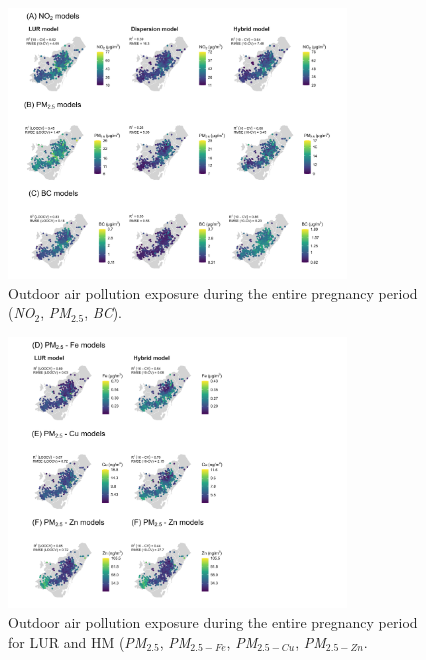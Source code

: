 \documentclass{article}
\begin{document}
\captionsetup[figure]{skip=4pt} %
\begin{figure}[!h]
\includegraphics[width=0.8\textwidth]{figures/combined_figure1_v3.png}
\caption{Outdoor air pollution exposure during the entire pregnancy period (\textit{NO$_2$}, \textit{PM$_{2.5}$}, \textit{BC}).}
\label{fig2}
\end{figure}

\begin{figure}[!h]
\includegraphics[width=0.8\textwidth]{figures/combined_figure2_v3.png}
\caption{Outdoor air pollution exposure during the entire pregnancy period for LUR and HM (\textit{PM$_{2.5}$}, \textit{PM$_{2.5-Fe}$}, \textit{PM$_{2.5-Cu}$}, \textit{PM$_{2.5-Zn}$}.}
\label{fig3}
\end{figure}
\end{document}
